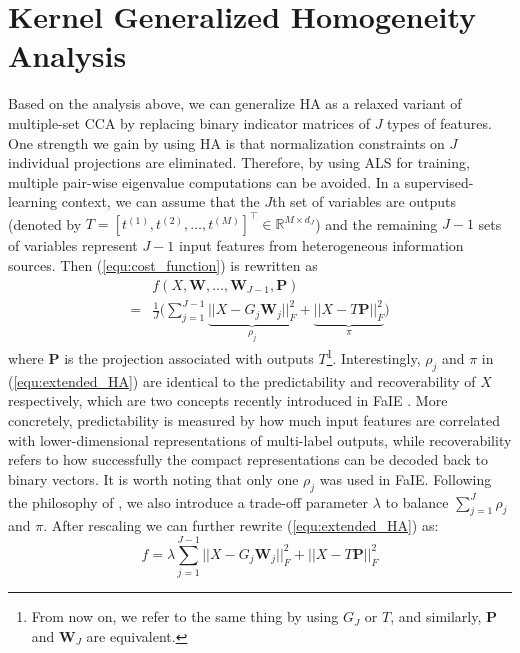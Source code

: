 \documentclass[a4paper]{article}
\begin{document}
\section{Kernel Generalized Homogeneity Analysis}
\label{sec:KGHA}
Based on the analysis above, we can generalize HA as a relaxed variant of multiple-set CCA by replacing binary indicator matrices of $J$ types of features. 
One strength we gain by using HA is that normalization constraints on $J$ individual projections are eliminated.         
Therefore, by using ALS for training, multiple pair-wise eigenvalue computations can be avoided.  
In a supervised-learning context, we can assume that the $J$th set of variables are outputs (denoted by $T=[t^{(1)},t^{(2)},\ldots, t^{(M)}]^\top \in \mathbb{R}^{M\times d_J}$) 
and the remaining $J-1$ sets of variables represent $J-1$ input features from heterogeneous information sources. Then (\ref{equ:cost_function}) is rewritten as
\begin{equation} 
    \begin{array}{cl}
         & \displaystyle f(X,\mathbf{W},\ldots, \mathbf{W}_{J-1}, \mathbf{P}) \\
        =& \displaystyle\frac{1}{J} \Bigg( \sum_{j=1}^{J-1} \underbrace{||X-G_j \mathbf{W}_j||_F^2}_{\rho_j}+\underbrace{||X-T \mathbf{P}||_F^2}_{\pi} \Bigg)
   \end{array}
  \label{equ:extended_HA}
\end{equation}
where $\mathbf{P}$ is the projection associated with outputs $T$\footnote{From now on, we refer to the same thing by using $G_J$ or $T$, and similarly, $\mathbf{P}$
and $\mathbf{W}_J$ are equivalent.}. Interestingly, $\rho_j$ and $\pi$ in (\ref{equ:extended_HA}) are identical to the predictability 
and recoverability of $X$ respectively, which are two concepts recently introduced in FaIE \cite{lin_2014_icml}. More concretely, predictability is measured by how much  
input features are correlated with lower-dimensional representations of multi-label outputs, while recoverability refers to how successfully the compact representations 
can be decoded back to binary vectors. It is worth noting that only one $\rho_j$ was used in FaIE.  
Following the philosophy of \citet{lin_2014_icml}, we also introduce a trade-off parameter $\lambda$ to balance $\sum_{j=1}^J \rho_j$ and $\pi$.  After rescaling we can further 
rewrite (\ref{equ:extended_HA}) as:
\begin{equation} 
    f=\displaystyle\lambda \sum_{j=1}^{J-1} ||X-G_j \mathbf{W}_j||_F^2+||X-T \mathbf{P}||_F^2 
  \label{equ:tradeoff_HA}
\end{equation}
\end{document}
